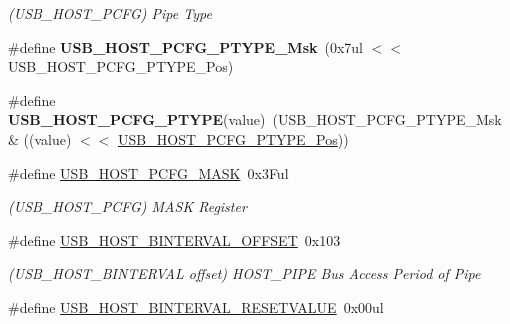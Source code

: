 \begin{DoxyCompactItemize}
\begin{DoxyCompactList}\small\item\em (U\+S\+B\+\_\+\+H\+O\+S\+T\+\_\+\+P\+C\+F\+G) Pipe Type \end{DoxyCompactList}\item 
\hypertarget{group___s_a_m_l21___u_s_b_gaa4021094a69676bb4f16d211785a5c90}{}\#define {\bfseries U\+S\+B\+\_\+\+H\+O\+S\+T\+\_\+\+P\+C\+F\+G\+\_\+\+P\+T\+Y\+P\+E\+\_\+\+Msk}~(0x7ul $<$$<$ U\+S\+B\+\_\+\+H\+O\+S\+T\+\_\+\+P\+C\+F\+G\+\_\+\+P\+T\+Y\+P\+E\+\_\+\+Pos)\label{group___s_a_m_l21___u_s_b_gaa4021094a69676bb4f16d211785a5c90}

\item 
\hypertarget{group___s_a_m_l21___u_s_b_ga73b86df08248a4400a3f1daa452f48ef}{}\#define {\bfseries U\+S\+B\+\_\+\+H\+O\+S\+T\+\_\+\+P\+C\+F\+G\+\_\+\+P\+T\+Y\+P\+E}(value)~(U\+S\+B\+\_\+\+H\+O\+S\+T\+\_\+\+P\+C\+F\+G\+\_\+\+P\+T\+Y\+P\+E\+\_\+\+Msk \& ((value) $<$$<$ \hyperlink{group___s_a_m_l21___u_s_b_gaa259f8f23e488d8bb4029b3b657e3d81}{U\+S\+B\+\_\+\+H\+O\+S\+T\+\_\+\+P\+C\+F\+G\+\_\+\+P\+T\+Y\+P\+E\+\_\+\+Pos}))\label{group___s_a_m_l21___u_s_b_ga73b86df08248a4400a3f1daa452f48ef}

\item 
\hypertarget{group___s_a_m_l21___u_s_b_gaf1909487316395d5e6486c19151d9456}{}\#define \hyperlink{group___s_a_m_l21___u_s_b_gaf1909487316395d5e6486c19151d9456}{U\+S\+B\+\_\+\+H\+O\+S\+T\+\_\+\+P\+C\+F\+G\+\_\+\+M\+A\+S\+K}~0x3\+Ful\label{group___s_a_m_l21___u_s_b_gaf1909487316395d5e6486c19151d9456}

\begin{DoxyCompactList}\small\item\em (U\+S\+B\+\_\+\+H\+O\+S\+T\+\_\+\+P\+C\+F\+G) M\+A\+S\+K Register \end{DoxyCompactList}\item 
\hypertarget{group___s_a_m_l21___u_s_b_ga7406e902329b6e5de4d897a8d1fb302f}{}\#define \hyperlink{group___s_a_m_l21___u_s_b_ga7406e902329b6e5de4d897a8d1fb302f}{U\+S\+B\+\_\+\+H\+O\+S\+T\+\_\+\+B\+I\+N\+T\+E\+R\+V\+A\+L\+\_\+\+O\+F\+F\+S\+E\+T}~0x103\label{group___s_a_m_l21___u_s_b_ga7406e902329b6e5de4d897a8d1fb302f}

\begin{DoxyCompactList}\small\item\em (U\+S\+B\+\_\+\+H\+O\+S\+T\+\_\+\+B\+I\+N\+T\+E\+R\+V\+A\+L offset) H\+O\+S\+T\+\_\+\+P\+I\+P\+E Bus Access Period of Pipe \end{DoxyCompactList}\item 
\hypertarget{group___s_a_m_l21___u_s_b_ga8e43acc07b00073e05b3bad3a6de097d}{}\#define \hyperlink{group___s_a_m_l21___u_s_b_ga8e43acc07b00073e05b3bad3a6de097d}{U\+S\+B\+\_\+\+H\+O\+S\+T\+\_\+\+B\+I\+N\+T\+E\+R\+V\+A\+L\+\_\+\+R\+E\+S\+E\+T\+V\+A\+L\+U\+E}~0x00ul\label{group___s_a_m_l21___u_s_b_ga8e43acc07b00073e05b3bad3a6de097d}


\end{DoxyCompactItemize}
